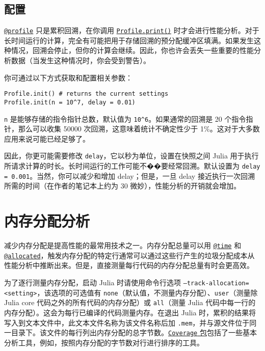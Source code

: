 \hypertarget{5894887495287635363}{}


\section{配置}



\hyperlink{9691715859147716436}{\texttt{@profile}} 只是累积回溯，在你调用 \hyperlink{2955792207246042270}{\texttt{Profile.print()}} 时才会进行性能分析。对于长时间运行的计算，完全有可能把用于存储回溯的预分配缓冲区填满。如果发生这种情况，回溯会停止，但你的计算会继续。因此，你也许会丢失一些重要的性能分析数据（当发生这种情况时，你会受到警告）。



你可通过以下方式获取和配置相关参数：




\begin{verbatim}
Profile.init() # returns the current settings
Profile.init(n = 10^7, delay = 0.01)
\end{verbatim}



\texttt{n} 是能够存储的指令指针总数，默认值为 \texttt{10{\textasciicircum}6}。如果通常的回溯是 20 个指令指针，那么可以收集 50000 次回溯，这意味着统计不确定性少于 1\%。这对于大多数应用来说可能已经足够了。



因此，你更可能需要修改 \texttt{delay}，它以秒为单位，设置在快照之间 Julia 用于执行所请求计算的时长。长时间运行的工作可能不��要经常回溯。默认设置为 \texttt{delay = 0.001}。当然，你可以减少和增加 delay；但是，一旦 delay 接近执行一次回溯所需的时间（在作者的笔记本上约为 30 微妙），性能分析的开销就会增加。



\hypertarget{15664789060024554869}{}


\chapter{内存分配分析}



减少内存分配是提高性能的最常用技术之一。内存分配总量可以用 \hyperlink{8029752041511656628}{\texttt{@time}} 和 \hyperlink{5377755456008435782}{\texttt{@allocated}}，触发内存分配的特定行通常可以通过这些行产生的垃圾分配成本从性能分析中推断出来。但是，直接测量每行代码的内存分配总量有时会更高效。



为了逐行测量内存分配，启动 Julia 时请使用命令行选项 \texttt{--track-allocation=<setting>}，该选项的可选值有 \texttt{none}（默认值，不测量内存分配）、\texttt{user}（测量除 Julia core 代码之外的所有代码的内存分配）或 \texttt{all}（测量 Julia 代码中每一行的内存分配）。这会为每行已编译的代码测量内存。在退出 Julia 时，累积的结果将写入到文本文件中，此文本文件名称为该文件名称后加 \texttt{.mem}，并与源文件位于同一目录下。该文件的每行列出内存分配的总字节数。\href{https://github.com/JuliaCI/Coverage.jl}{\texttt{Coverage} 包}包括了一些基本分析工具，例如，按照内存分配的字节数对行进行排序的工具。



